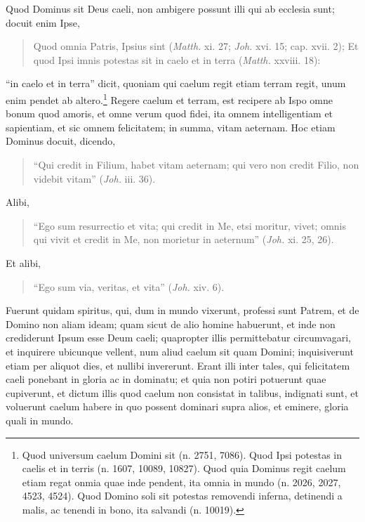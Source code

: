 \begin{topic}{5}
    Quod Dominus sit Deus caeli, non ambigere possunt illi qui ab ecclesia sunt; docuit enim Ipse,
    \begin{quote}
        Quod omnia Patris, Ipsius sint (\emph{Matth.} xi. 27; \emph{Joh.} xvi. 15; cap. xvii. 2); Et quod Ipsi imnis
        potestas sit in caelo et in terra (\emph{Matth.} xxviii. 18):
    \end{quote}
    ``in caelo et in terra'' dicit, quoniam qui caelum regit etiam terram regit, unum enim pendet ab altero.\footnote{
    Quod universum caelum Domini sit (n. 2751, 7086).
    Quod Ipsi potestas in caelis et in terris (n. 1607, 10089, 10827).
    Quod quia Dominus regit caelum etiam regat onmia quae inde pendent, ita omnia in mundo (n. 2026, 2027, 4523, 4524).
    Quod Domino soli sit potestas removendi inferna, detinendi a malis, ac tenendi in bono, ita salvandi (n. 10019).}
    Regere caelum et terram, est recipere ab Ispo omne bonum quod amoris, et omne verum quod fidei, ita omnem
    intelligentiam et sapientiam, et sic omnem felicitatem; in summa, vitam aeternam.
    Hoc etiam Dominus docuit, dicendo,
    \begin{quote}
        ``Qui credit in Filium, habet vitam aeternam; qui vero non credit Filio, non videbit vitam'' (\emph{Joh.} iii.
        36).
    \end{quote}
    Alibi,
    \begin{quote}
        ``Ego sum resurrectio et vita; qui credit in Me, etsi moritur, vivet; omnis qui vivit et credit in Me, non
        morietur in aeternum'' (\emph{Joh.} xi. 25, 26).
    \end{quote}
    Et alibi,
    \begin{quote}
        ``Ego sum via, veritas, et vita'' (\emph{Joh.} xiv. 6).
    \end{quote}
\end{topic}

\begin{topic}{6}
    Fuerunt quidam spiritus, qui, dum in mundo vixerunt, professi sunt Patrem, et de Domino non aliam ideam; quam sicut
    de alio homine habuerunt, et inde non crediderunt Ipsum esse Deum caeli; quapropter illis permittebatur
    circumvagari, et inquirere ubicunque vellent, num aliud caelum sit quam Domini; inquisiverunt etiam per aliquot
    dies, et nullibi invererunt.
    Erant illi inter tales, qui felicitatem caeli ponebant in gloria ac in dominatu; et quia non potiri potuerunt quae
    cupiverunt, et dictum illis quod caelum non consistat in talibus, indignati sunt, et voluerunt caelum habere in quo
    possent dominari supra alios, et eminere, gloria quali in mundo.
\end{topic}
